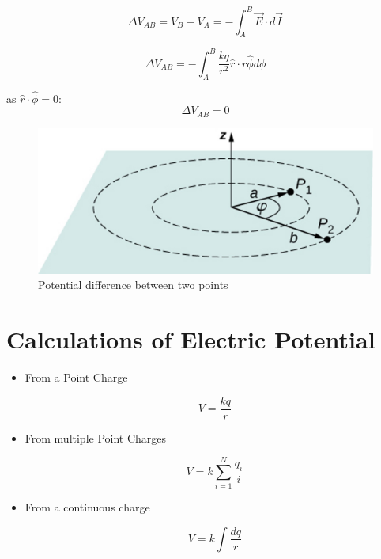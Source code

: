 \documentclass[14pt]{memoir}
\begin{document}
\begin{equation}
\Delta V_{AB} = V_B - V_A = -\int_A^B \vec{E} \cdot d\vec{I}
\end{equation}

\begin{equation}
\Delta V_{AB} =  -\int_A^B \frac{kq}{r^2} \hat{r} \cdot r \hat{\phi} d\phi
\end{equation}

as $\hat{r} \cdot \hat{\phi} = 0$:
\begin{equation}
\Delta V_{AB} =  0
\end{equation}


\begin{figure}[H]
\begin{center}
\includegraphics[scale=0.40]{fig/fig_07_17.jpg}
\caption{Potential difference between two points}
\label{fig:07_17}
\end{center}
\end{figure}


\section{Calculations of Electric Potential}

\begin{itemize}
\item From a Point Charge

\begin{equation}
V = \frac{kq}{r}
\end{equation}

\item From multiple Point Charges

\begin{equation}
V = k \sum_{i=1}^{N}\frac{q_i}{i}
\end{equation}

\item From a continuous charge

\begin{equation}
V = k \int \frac{dq}{r}
\end{equation}

\end{itemize}
\end{document}
